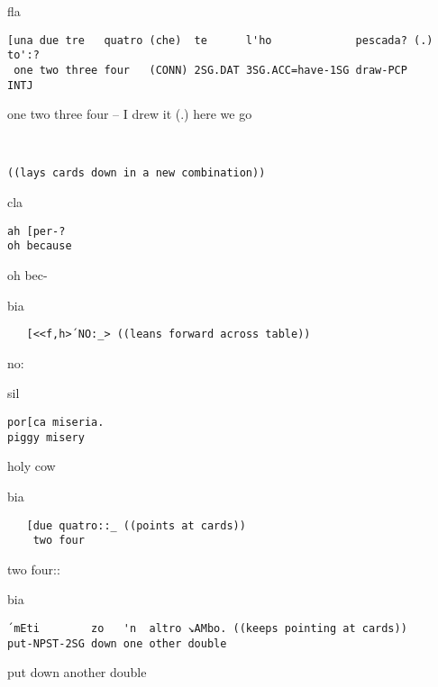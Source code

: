 \documentclass[output=paper,modfonts]{langscibook}
\begin{document}
\vspace{2mm}
%
\begin{transbox}{1}{fla}
\begin{verbatim}
[una due tre   quatro (che)  te      l'ho             pescada? (.) to':?
 one two three four   (CONN) 2SG.DAT 3SG.ACC=have-1SG draw-PCP     INTJ
\end{verbatim}
\hspace{0.07cm} one two three four -- I drew it (.) here we go
\end{transbox}\vspace{1mm}
%
\begin{transbox}{2}{~}
\begin{verbatim}
((lays cards down in a new combination))
\end{verbatim}
\end{transbox}
%
\begin{transbox}{3}{cla}
\begin{verbatim}
ah [per-?
oh because
\end{verbatim}
oh bec-
\end{transbox}\vspace{1mm}
%
\begin{transbox}{4}{bia}
\begin{verbatim}
   [<<f,h>´NO:_> ((leans forward across table))
\end{verbatim}
\hspace{1.5cm} no:
\end{transbox}\vspace{1mm}
%
\begin{transbox}{5}{sil}
\begin{verbatim}
por[ca miseria.
piggy misery
\end{verbatim}
holy cow
\end{transbox}\vspace{1mm}
%
\begin{transbox}{6}{bia}
\begin{verbatim}
   [due quatro::_ ((points at cards))
    two four
\end{verbatim}
\hspace{0.5cm} two four::
\end{transbox}\vspace{2mm}
%
\vspace{-0.25mm}
%
\begin{mdframednoverticalspace}[style=firstfoc]
\begin{transbox}{8}{bia}
\begin{verbatim}
´mEti        zo   'n  altro ↘AMbo. ((keeps pointing at cards))
put-NPST-2SG down one other double
\end{verbatim}
put down another double
\end{transbox}
\end{mdframednoverticalspace}\vspace{1.5mm}
\end{document}
